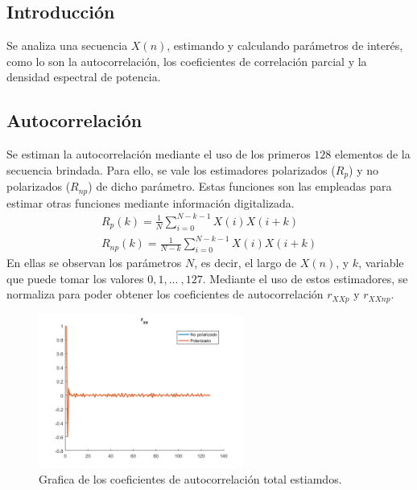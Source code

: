 



\subsection{Introducción}

Se analiza una secuencia $X(n)$, estimando y calculando parámetros de interés, como lo son la autocorrelación, los coeficientes de correlación parcial y la densidad espectral de potencia.

\subsection{Autocorrelación} 

Se estiman la autocorrelación mediante el uso de los primeros $128$ elementos de la secuencia brindada. Para ello, se vale los estimadores polarizados ($R_{p}$) y no polarizados ($R_{np}$) de dicho parámetro. Estas funciones son las empleadas para estimar otras funciones mediante información digitalizada.
\begin{equation*}
\begin{gathered}
	R_{p}(k) = \frac{1}{N} \sum_{i=0}^{N-k-1} X(i)X(i+k)	\\
	R_{np}(k) = \frac{1}{N-k} \sum_{i=0}^{N-k-1} X(i)X(i+k)
\end{gathered}
\end{equation*}
En ellas se observan los parámetros $N$, es decir, el largo de $X(n)$, y $k$, variable que puede tomar los valores $0, 1, ... \ , 127$. Mediante el uso de estos estimadores, se normaliza para poder obtener los coeficientes de autocorrelación $r_{XXp}$ y $r_{XXnp}$. 

\begin{figure}[H]
\centering
	\includegraphics[width=0.6\textwidth, trim = {0 0 0 0.7cm},clip]{./ImagenesEjercicio2/rxx.png}
	\caption{Grafica de los coeficientes de autocorrelación total estiamdos.}
	\label{fig:rxx}
\end{figure}

